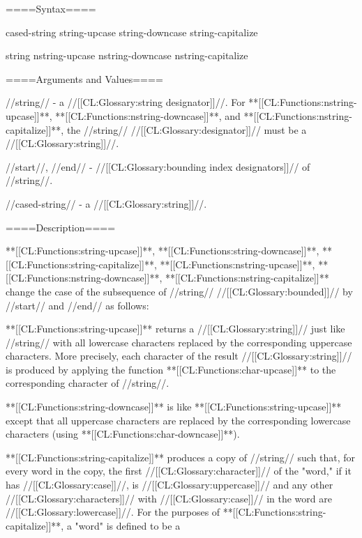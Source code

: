 
====Syntax====

 {cased-string} {string-upcase string-downcase string-capitalize}

 {string} {nstring-upcase nstring-downcase nstring-capitalize}

====Arguments and Values====

//string// - a //[[CL:Glossary:string designator]]//. For **[[CL:Functions:nstring-upcase]]**, **[[CL:Functions:nstring-downcase]]**, and **[[CL:Functions:nstring-capitalize]]**, the //string// //[[CL:Glossary:designator]]// must be a //[[CL:Glossary:string]]//.



//start//, //end// - //[[CL:Glossary:bounding index designators]]// of //string//. 

//cased-string// - a //[[CL:Glossary:string]]//.

====Description====

**[[CL:Functions:string-upcase]]**, **[[CL:Functions:string-downcase]]**, **[[CL:Functions:string-capitalize]]**, **[[CL:Functions:nstring-upcase]]**, **[[CL:Functions:nstring-downcase]]**, **[[CL:Functions:nstring-capitalize]]** change the case of the subsequence of //string// //[[CL:Glossary:bounded]]// by //start// and //end// as follows:

\beginlist {}

**[[CL:Functions:string-upcase]]** returns a //[[CL:Glossary:string]]// just like //string// with all lowercase characters replaced by the corresponding uppercase characters. More precisely, each character of the result //[[CL:Glossary:string]]// is produced by applying the function **[[CL:Functions:char-upcase]]** to the corresponding character of //string//.


**[[CL:Functions:string-downcase]]** is like **[[CL:Functions:string-upcase]]** except that all uppercase characters are replaced by the corresponding lowercase characters (using **[[CL:Functions:char-downcase]]**).


**[[CL:Functions:string-capitalize]]** produces a copy of //string// such that, for every word in the copy, the first //[[CL:Glossary:character]]// of the "word," if it has //[[CL:Glossary:case]]//, is //[[CL:Glossary:uppercase]]// and any other //[[CL:Glossary:characters]]// with //[[CL:Glossary:case]]// in the word are //[[CL:Glossary:lowercase]]//. For the purposes of **[[CL:Functions:string-capitalize]]**, a "word" is defined to be a

